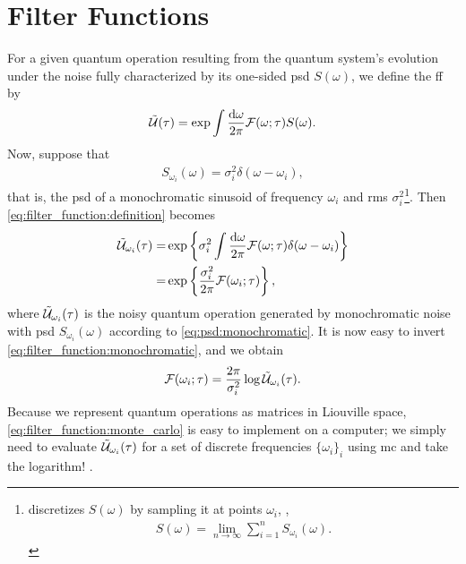\chapter{Filter Functions}\label{ch:filter_functions}
For a given quantum operation \liouvUe resulting from the quantum system's evolution under the noise fully characterized by its one-sided \gls{psd} $S(\omega)$, we define the \gls{ff} \FF by
\begin{align}
    \label{eq:filter_function:definition}
    \mathcal{\tilde{U}}(\tau) = \exp\int\frac{\dd{\omega}}{2\pi}\mathcal{F}(\omega;\tau) S(\omega).
\end{align}
Now, suppose that
\begin{align}
    \label{eq:psd:monochromatic}
    S_{\omega_i}(\omega) = \sigma_i^2 \delta(\omega - \omega_i), %
\end{align}
that is, the \gls{psd} of a monochromatic sinusoid of frequency $\omega_i$ and \gls{rms} $\sigma_i^2$\footnote{
     discretizes $S(\omega)$ by sampling it at points $\omega_i$, \ie,
    \begin{align}
        S(\omega) = \lim_{n\to\infty}\sum_{i=1}^n S_{\omega_i}(\omega).
    \end{align}
}. %
Then \cref{eq:filter_function:definition} becomes
\begin{equation}
    \label{eq:filter_function:monochromatic}
    \begin{split}
        \mathcal{\tilde{U}}_{\omega_i}(\tau) =& \exp\left\lbrace\sigma_i^2\int\frac{\dd{\omega}}{2\pi}\mathcal{F}(\omega;\tau)\delta(\omega - \omega_i)\right\rbrace \\
                             =& \exp\left\lbrace\frac{\sigma_i^2}{2\pi}\mathcal{F}(\omega_i;\tau)\right\rbrace,
    \end{split}
\end{equation}
where $\mathcal{\tilde{U}}_{\omega_i}(\tau)$ is the noisy quantum operation generated by monochromatic noise with \gls{psd} $S_{\omega_i}(\omega)$ according to \cref{eq:psd:monochromatic}.
It is now easy to invert \cref{eq:filter_function:monochromatic}, and we obtain
\begin{align}
    \label{eq:filter_function:monte_carlo}
    \mathcal{F}(\omega_i; \tau) = \frac{2\pi}{\sigma_i^2}\log\mathcal{\tilde{U}}_{\omega_i}(\tau).
\end{align}
Because we represent quantum operations as matrices in Liouville space, \cref{eq:filter_function:monte_carlo} is easy to implement on a computer; we simply need to evaluate $\mathcal{\tilde{U}}_{\omega_i}(\tau)$ for a set of discrete frequencies $\lbrace\omega_i\rbrace_i$ using \gls{mc} and take the logarithm! \cite{Geck2021}.%


